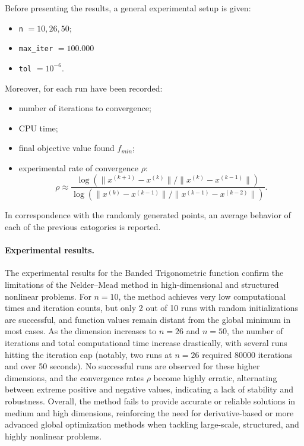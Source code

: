 \documentclass[a4paper,12pt]{article}
\begin{document}
	\noindent Before presenting the results, a general experimental setup is given:
	\begin{itemize}
		\item \texttt{n} $= 10, 26, 50$;
		\item \texttt{max\_iter} $= 100.000$
		\item \texttt{tol} $= 10^{-6}$.
	\end{itemize}
	
	Moreover, for each run have been recorded:
	\begin{itemize}
		\item number of iterations to convergence;
		\item CPU time;
		\item final objective value found \(f_{min}\);
		\item experimental rate of convergence \(\rho\):
		\[
		\rho \approx \frac{\log\left(\|x^{(k+1)} - x^{(k)}\|\big/\|x^{(k)} - x^{(k-1)}\|\right)}{\log\left(\|x^{(k)} - x^{(k-1)}\|\big/\|x^{(k-1)} - x^{(k-2)}\|\right)}.
		\]
			\end{itemize}
	
	In correspondence with the randomly generated points, an average behavior of each of the previous catogories is reported.
		
	\vspace{1em}
	\paragraph{Experimental results.}
	The experimental results for the Banded Trigonometric function confirm the limitations of the Nelder–Mead method in high-dimensional and structured nonlinear problems. For $n=10$, the method achieves very low computational times and iteration counts, but only 2 out of 10 runs with random initializations are successful, and function values remain distant from the global minimum in most cases. As the dimension increases to $n=26$ and $n=50$, the number of iterations and total computational time increase drastically, with several runs hitting the iteration cap (notably, two runs at $n=26$ required 80000 iterations and over 50 seconds). No successful runs are observed for these higher dimensions, and the convergence rates $\rho$ become highly erratic, alternating between extreme positive and negative values, indicating a lack of stability and robustness. Overall, the method fails to provide accurate or reliable solutions in medium and high dimensions, reinforcing the need for derivative-based or more advanced global optimization methods when tackling large-scale, structured, and highly nonlinear problems.
	
\end{document}
